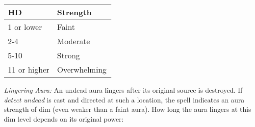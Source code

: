 \begin{longtable}{llll}
\hline
\multicolumn{1}{|p{0.829in}|}{\begin{minipage}[t]{0.829in}\raggedright
\textbf{HD}\end{minipage}} & \multicolumn{1}{p{0.983in}|}{\begin{minipage}[t]{0.983in}\raggedright
\textbf{Strength}\end{minipage}}\\
\hline
\multicolumn{1}{p{0.069in}|}{\begin{minipage}[t]{0.069in}\raggedright
1 or lower\end{minipage}} & \multicolumn{1}{p{0.069in}|}{\begin{minipage}[t]{0.069in}\raggedright
Faint\end{minipage}}\\
\hline
\multicolumn{1}{|p{0.829in}|}{\begin{minipage}[t]{0.829in}\raggedright
2-4\end{minipage}} & \multicolumn{1}{p{0.983in}|}{\begin{minipage}[t]{0.983in}\raggedright
Moderate\end{minipage}}\\
\hline
\multicolumn{1}{p{0.069in}|}{\begin{minipage}[t]{0.069in}\raggedright
5-10\end{minipage}} & \multicolumn{1}{p{0.069in}|}{\begin{minipage}[t]{0.069in}\raggedright
Strong\end{minipage}}\\
\hline
\multicolumn{1}{|p{0.829in}|}{\begin{minipage}[t]{0.829in}\raggedright
11 or higher\end{minipage}} & \multicolumn{3}{p{1.122in}|}{\begin{minipage}[t]{1.122in}\raggedright
Overwhelming\end{minipage}}\\
\hline
\end{longtable}

\textit{Lingering Aura:} An undead aura lingers after its original source is destroyed. 
If \textit{detect undead} is cast and directed at such a location, the spell indicates 
an aura strength of dim (even weaker than a faint aura). How long the aura lingers 
at this dim level depends on its original power:

